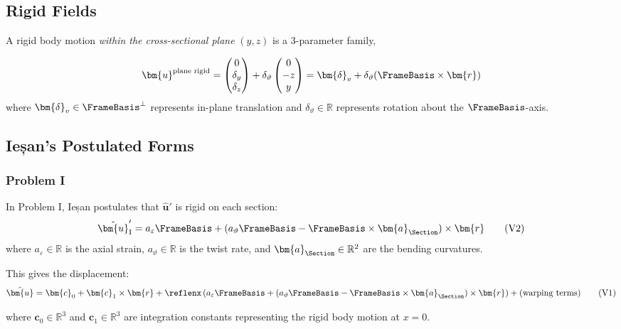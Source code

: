 \subsection{Rigid Fields}


A rigid body motion \emph{within the cross-sectional plane}
\((y,z)\) is a 3-parameter family,

\[
\bm{u}^{\text{plane rigid}} 
= \begin{pmatrix} 0 \\ \delta_y \\ \delta_z \end{pmatrix} 
+ \delta_\vartheta \begin{pmatrix}
0 \\ -z \\ y 
\end{pmatrix}
= \bm{\delta}_v + \delta_{\vartheta}(\FrameBasis \times \bm{r})
\]
where
\(\bm{\delta}_v \in \FrameBasis^\perp\)
represents in-plane translation and \(\delta_\vartheta \in \mathbb{R}\)
represents rotation about the \(\FrameBasis\)-axis. 

\subsection{Ieșan's Postulated Forms}

\subsubsection{Problem I}

In Problem I, Ieșan postulates that \(\hat{\bm{u}}'\) is rigid on each
section:
\[
\hat{\bm{u}}'_{\text{I}} = a_\varepsilon \FrameBasis + (a_\vartheta \FrameBasis - \FrameBasis \times \bm{a}_{\Section}) \times \bm{r}
\tag{V2}
\]
where \(a_\varepsilon \in \mathbb{R}\) is the axial strain,
\(a_\vartheta \in \mathbb{R}\) is the twist rate, and
\(\bm{a}_{\Section} \in \mathbb{R}^2\) are the bending
curvatures.

This gives the displacement:
\[
\hat{\bm{u}} = \bm{c}_0 + \bm{c}_1 \times \bm{r} + \reflenx\,(a_\varepsilon \FrameBasis + (a_\vartheta \FrameBasis - \FrameBasis \times \bm{a}_{\Section}) \times \bm{r}) + \text{(warping terms)}
\tag{V1}
\]

where \(\bm{c}_0 \in \mathbb{R}^3\) and
\(\bm{c}_1 \in \mathbb{R}^3\) are integration constants representing
the rigid body motion at \(x=0\).


